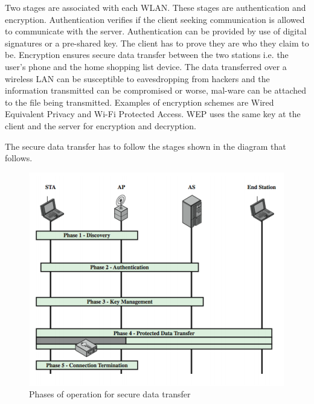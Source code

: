Two stages are associated with each WLAN. These stages are authentication and encryption.
Authentication verifies if the client seeking communication is allowed to communicate with the server. Authentication can be provided by use of digital signatures or a pre-shared key.
The client has to prove they are who they claim to be. Encryption ensures secure data transfer between the two stations i.e. the user's phone and the home shopping list device. The data transferred over a wireless LAN can be susceptible to eavesdropping from hackers and the information transmitted can be compromised or worse, mal-ware can be attached to the file being transmitted. Examples of encryption schemes are Wired Equivalent Privacy and Wi-Fi Protected Access. WEP uses the same key at the client and the server for encryption and decryption.

The secure data transfer has to follow the stages shown in the diagram that follows.\\

\begin{figure}[h]
	\centering
	\includegraphics[scale=1]{28}
	\caption{Phases of operation for secure data transfer}
\end{figure}

